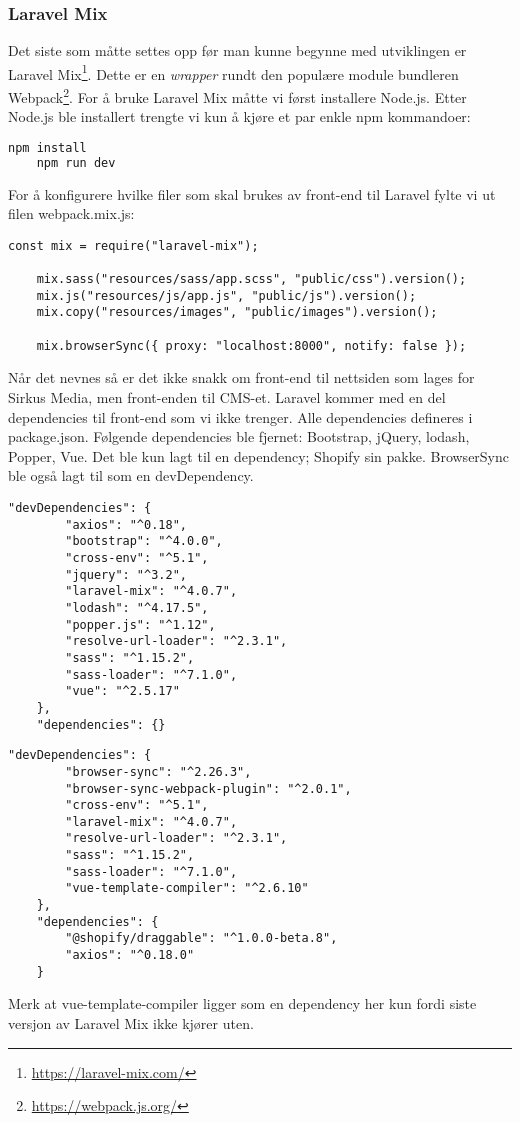 \subsubsection{Laravel Mix}
Det siste som måtte settes opp før man kunne begynne med utviklingen er Laravel Mix\footnote{\url{https://laravel-mix.com/}}.
Dette er en \textit{wrapper} rundt den populære module bundleren Webpack\footnote{\url{https://webpack.js.org/}}. For å bruke Laravel Mix måtte vi først installere Node.js. Etter Node.js ble installert trengte vi kun å kjøre et par enkle npm kommandoer:
\begin{lstlisting}[caption={npm kommando for å sette opp front-end til Laravel}, language=bash]
    npm install
    npm run dev
\end{lstlisting}

For å konfigurere hvilke filer som skal brukes av front-end til Laravel fylte vi ut filen webpack.mix.js:
\begin{lstlisting}[caption={Eksempel på oppsett av webpack.mix.js}]
    const mix = require("laravel-mix");

    mix.sass("resources/sass/app.scss", "public/css").version();
    mix.js("resources/js/app.js", "public/js").version();
    mix.copy("resources/images", "public/images").version();

    mix.browserSync({ proxy: "localhost:8000", notify: false });
\end{lstlisting}

Når det nevnes  så er det ikke snakk om front-end til nettsiden som lages for Sirkus Media, men front-enden til CMS-et.
Laravel kommer med en del dependencies til front-end som vi ikke trenger. Alle dependencies defineres i package.json. Følgende dependencies ble fjernet: Bootstrap, jQuery, lodash, Popper, Vue. Det ble kun lagt til en dependency; Shopify sin  pakke. BrowserSync ble også lagt til som en devDependency.

\begin{lstlisting}[caption={Orginal package.json}]
    "devDependencies": {
        "axios": "^0.18",
        "bootstrap": "^4.0.0",
        "cross-env": "^5.1",
        "jquery": "^3.2",
        "laravel-mix": "^4.0.7",
        "lodash": "^4.17.5",
        "popper.js": "^1.12",
        "resolve-url-loader": "^2.3.1",
        "sass": "^1.15.2",
        "sass-loader": "^7.1.0",
        "vue": "^2.5.17"
    },
    "dependencies": {}
\end{lstlisting}

\begin{lstlisting}[caption={Siste package.json}]
    "devDependencies": {
        "browser-sync": "^2.26.3",
        "browser-sync-webpack-plugin": "^2.0.1",
        "cross-env": "^5.1",
        "laravel-mix": "^4.0.7",
        "resolve-url-loader": "^2.3.1",
        "sass": "^1.15.2",
        "sass-loader": "^7.1.0",
        "vue-template-compiler": "^2.6.10"
    },
    "dependencies": {
        "@shopify/draggable": "^1.0.0-beta.8",
        "axios": "^0.18.0"
    }
\end{lstlisting}
Merk at vue-template-compiler ligger som en dependency her kun fordi siste versjon av Laravel Mix ikke kjører uten.

